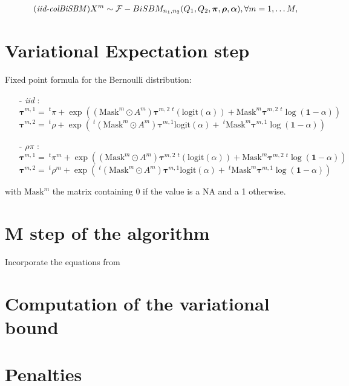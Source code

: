 \documentclass[12pt,a4paper]{report}
\begin{document}
\begin{align}
    \tag{\emph{iid-colBiSBM}}
    X^m \sim \mathcal{F}-BiSBM_{n_1,n_2} (Q_1, Q_2, \bm{\pi}, \bm{\rho}, \bm{\alpha}), \forall m = 1, \dots M,
\end{align}


\section{Variational Expectation step}
\label{sec:variational-expectation-step}
Fixed point formula for the Bernoulli distribution:
\begin{itemize}
    \item[-] \textit{iid} :
        \[ \bm{\tau}^{m,1} = ~^{t}\pi + \exp((\text{Mask}^{m} \odot A^{m})
            \bm{\tau}^{m,2} ~^{t}(\text{logit}(\alpha)) + \text{Mask}^{m}
            \bm{\tau}^{m,2} ~^{t}\log(\bm{1} - \alpha)) \]
        \[ \bm{\tau}^{m,2} = ~^{t}\rho + \exp(~^{t}(\text{Mask}^{m} \odot A^{m})
            \bm{\tau}^{m,1} \text{logit}(\alpha) + ~^{t}\text{Mask}^{m}
            \bm{\tau}^{m,1} \log(\bm{1} - \alpha)) \]
    \item[-] $\rho\pi$ :
        \[ \bm{\tau}^{m,1} = ~^{t}\pi^{m} + \exp((\text{Mask}^{m} \odot A^{m})
            \bm{\tau}^{m,2} ~^{t}(\text{logit}(\alpha)) + \text{Mask}^{m}
            \bm{\tau}^{m,2} ~^{t}\log(\bm{1} - \alpha)) \]
        \[ \bm{\tau}^{m,2} = ~^{t}\rho^{m} + \exp(~^{t}(\text{Mask}^{m} \odot A^{m})
            \bm{\tau}^{m,1} \text{logit}(\alpha) + ~^{t}\text{Mask}^{m}
            \bm{\tau}^{m,1} \log(\bm{1} - \alpha)) \]
\end{itemize}

with $\text{Mask}^{m}$ the matrix containing $0$ if the value is a NA and a 1
otherwise.

\section{M step of the algorithm}
\label{sec:m-step-of-the-algorithm}
Incorporate the equations from \parencite{chabert-liddellLearningCommonStructures2023}

\section{Computation of the variational bound}
\label{sec:computation-of-the-variational-bound}

\section{Penalties}
\label{sec:penalties}
\end{document}
